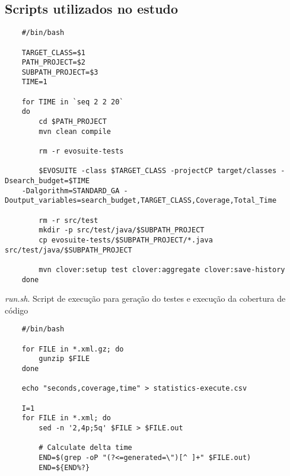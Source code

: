 \begin{apendicesenv}

\partapendices

\chapter{Scripts utilizados no estudo}
\label{scripts}

\begin{listing}
    \begin{verbatim}
    #/bin/bash
    
    TARGET_CLASS=$1
    PATH_PROJECT=$2
    SUBPATH_PROJECT=$3
    TIME=1
    
    for TIME in `seq 2 2 20`
    do
        cd $PATH_PROJECT
        mvn clean compile
    
        rm -r evosuite-tests
    
        $EVOSUITE -class $TARGET_CLASS -projectCP target/classes -Dsearch_budget=$TIME 
    -Dalgorithm=STANDARD_GA -Doutput_variables=search_budget,TARGET_CLASS,Coverage,Total_Time
    
        rm -r src/test  
        mkdir -p src/test/java/$SUBPATH_PROJECT
        cp evosuite-tests/$SUBPATH_PROJECT/*.java src/test/java/$SUBPATH_PROJECT
    
        mvn clover:setup test clover:aggregate clover:save-history
    done
    \end{verbatim}  
    \caption{\textit{run.sh}. Script de execução para geração do testes e execução da cobertura de código}  
    \label{run.sh}
\end{listing}


\begin{listing}
    \begin{verbatim}
    #/bin/bash

    for FILE in *.xml.gz; do
        gunzip $FILE
    done

    echo "seconds,coverage,time" > statistics-execute.csv

    I=1
    for FILE in *.xml; do
        sed -n '2,4p;5q' $FILE > $FILE.out

        # Calculate delta time
        END=$(grep -oP "(?<=generated=\")[^ ]+" $FILE.out)
        END=${END%?}
        

\end{verbatim}
\end{listing}
\end{apendicesenv}
